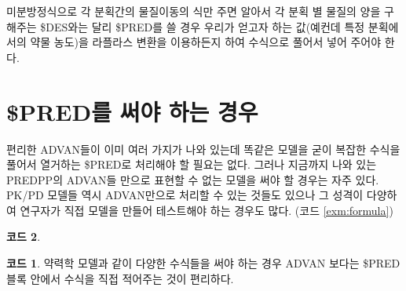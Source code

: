 \documentclass[
  10pt,
  krantz2,
  a4paper]{krantz}
\newenvironment{Shaded}{\begin{snugshade}}{\end{snugshade}}
\newcommand{\DecValTok}[1]{\textcolor[rgb]{0.00,0.00,0.81}{#1}}
\newcommand{\ErrorTok}[1]{\textcolor[rgb]{0.64,0.00,0.00}{\textbf{#1}}}
\newcommand{\KeywordTok}[1]{\textcolor[rgb]{0.13,0.29,0.53}{\textbf{#1}}}
\newcommand{\NormalTok}[1]{#1}
\newcommand{\OperatorTok}[1]{\textcolor[rgb]{0.81,0.36,0.00}{\textbf{#1}}}
\newcommand{\StringTok}[1]{\textcolor[rgb]{0.31,0.60,0.02}{#1}}
\theoremstyle{definition}
\theoremstyle{definition}
\newtheorem{example}{코드}[chapter]
\theoremstyle{definition}
\theoremstyle{remark}
\begin{document}
미분방정식으로 각 분획간의 물질이동의 식만 주면 알아서 각 분획 별 물질의 양을 구해주는 \$DES와는 달리 \$PRED를 쓸 경우 우리가 얻고자 하는 값(예컨데 특정 분획에서의 약물 농도)을 라플라스 변환을 이용하든지 하여 수식으로 풀어서 넣어 주어야 한다.

\hypertarget{preduxb97c-uxc368uxc57c-uxd558uxb294-uxacbduxc6b0}{%
\section{\$PRED를 써야 하는 경우}\label{preduxb97c-uxc368uxc57c-uxd558uxb294-uxacbduxc6b0}}

편리한 ADVAN들이 이미 여러 가지가 나와 있는데 똑같은 모델을 굳이 복잡한 수식을 풀어서 열거하는 \$PRED로 처리해야 할 필요는 없다. 그러나 지금까지 나와 있는 PREDPP의 ADVAN들 만으로 표현할 수 없는 모델을 써야 할 경우는 자주 있다. PK/PD 모델들 역시 ADVAN만으로 처리할 수 있는 것들도 있으나 그 성격이 다양하여 연구자가 직접 모델을 만들어 테스트해야 하는 경우도 많다. (코드 \ref{exm:formula})

\begin{Shaded}
\end{Shaded}

\begin{example}
\begin{example}

\protect\hypertarget{exm:formula}{}{\label{exm:formula} }약력학 모델과 같이 다양한 수식들을 써야 하는 경우 ADVAN 보다는 \$PRED 블록 안에서 수식을 직접 적어주는 것이 편리하다.

\end{example}
\end{example}
\end{document}
